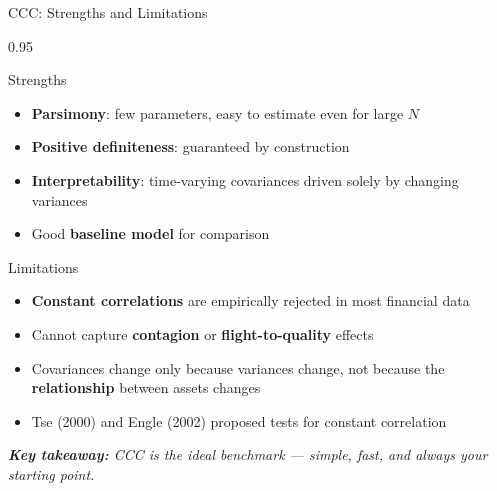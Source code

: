 \documentclass[9pt, aspectratio=169, t]{beamer}
\begin{document}
\begin{frame}{CCC: Strengths and Limitations}
    \begin{cminipage}{0.95\textwidth}
    {\footnotesize
    \begin{block}{Strengths}
        \begin{itemize}\setlength{\itemsep}{0pt}
            \item \textbf{Parsimony}: few parameters, easy to estimate even for large $N$
            \item \textbf{Positive definiteness}: guaranteed by construction
            \item \textbf{Interpretability}: time-varying covariances driven solely by changing variances
            \item Good \textbf{baseline model} for comparison
        \end{itemize}
    \end{block}
    \vspace{0.2cm}
    \begin{alertblock}{Limitations}
        \begin{itemize}\setlength{\itemsep}{0pt}
            \item \textbf{Constant correlations} are empirically rejected in most financial data
            \item Cannot capture \textbf{contagion} or \textbf{flight-to-quality} effects
            \item Covariances change only because variances change, not because the \textbf{relationship} between assets changes
            \item Tse (2000) and Engle (2002) proposed tests for constant correlation
        \end{itemize}
    \end{alertblock}
    \textit{\textbf{Key takeaway:} CCC is the ideal benchmark --- simple, fast, and always your starting point.}
    }
    \end{cminipage}
\end{frame}

\end{document}
